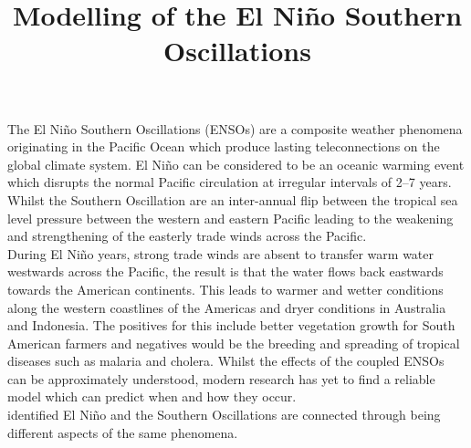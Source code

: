 \documentclass[12pt, onecolumn]{revtex4}    %
\begin{document}
                     

\title{Modelling of the El Ni\~{n}o Southern Oscillations} 

\maketitle
\thispagestyle{plain} %

The El Ni\~{n}o Southern Oscillations (ENSOs) are a composite weather phenomena originating in the Pacific Ocean which produce lasting teleconnections on the global climate system. El Ni\~{n}o can be considered to be an oceanic warming event which disrupts the normal Pacific circulation at irregular intervals of 2--7 years. Whilst the Southern Oscillation are an inter-annual flip between the tropical sea level pressure between the western and eastern Pacific leading to the weakening and strengthening of the easterly trade winds across the Pacific. \\

During El Ni\~{n}o years, strong trade winds are absent to transfer warm water westwards across the Pacific, the result is that the water flows back eastwards towards the American continents. This leads to warmer and wetter conditions along the western coastlines of the Americas and dryer conditions in Australia and Indonesia. The positives for this include better vegetation growth for South American farmers and negatives would be the breeding and spreading of tropical diseases such as malaria and cholera. Whilst the effects of the coupled ENSOs can be approximately understood, modern research has yet to find a reliable model which can predict when and how they occur. \\

\cite{doi:10.1175/1520-04931969097} identified El Ni\~{n}o and the Southern Oscillations are connected through being different aspects of the same phenomena. \\



\newpage

\nocite{wang2017nino}
\nocite{ruddiman_climate}


\end{document}
